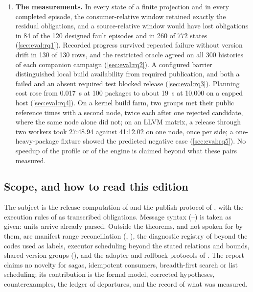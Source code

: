 \begin{enumerate}[leftmargin=2em]
{    places}, none of which loses a release silently except the stranded
    consumer of \cref{ob:owed}; \cref{sec:departures} tabulates them with
    their status.
  \item \textbf{The measurements.} In every state of a finite projection and in
    every completed episode, the consumer-relative window retained exactly the
    residual obligations, and a source-relative window would have lost
    obligations in 84 of the 120 designed fault episodes and in 260 of 772
    states (\cref{sec:eval:rq1}). Recorded progress survived repeated failure
    without version drift in 130 of 130 rows, and the restricted oracle agreed
    on all 300 histories of each companion campaign (\cref{sec:eval:rq2}). A
    configured barrier distinguished local build availability from required
    publication, and both a failed and an absent required test blocked release
    (\cref{sec:eval:rq3}). Planning cost rose from 0.017~s at 100 packages to
    about 19~s at 10,000 on a capped host (\cref{sec:eval:rq4}). On a kernel
    build farm, two groups met their public reference times with a second node,
    twice each after one rejected candidate, where the same node alone did
    not; on an LLVM matrix, a release through two workers took 27:48.94
    against 41:12.02 on one node, once per side; a one-heavy-package fixture
    showed the predicted negative case (\cref{sec:eval:rq5}). No speedup of the
    profile or of the engine is claimed beyond what these pairs measured.
\end{enumerate}

\subsection{Scope, and how to read this edition}

The subject is the release computation of  and the publish protocol
of , with the execution rules of  as transcribed
obligations. Message syntax (--) is taken as given: units
arrive already parsed. Outside the theorems, and not spoken for by them, are
manifest range reconciliation (, ), the diagnostic
registry of  beyond the codes used as labels, executor scheduling
beyond the stated relations and bounds, shared-version groups
(), and the adapter and rollback protocols of . The
report claims no novelty for sagas, idempotent consumers, breadth-first
search or list scheduling; its contribution is the formal model, corrected
hypotheses, counterexamples, the ledger of departures, and the record of what
was measured.

